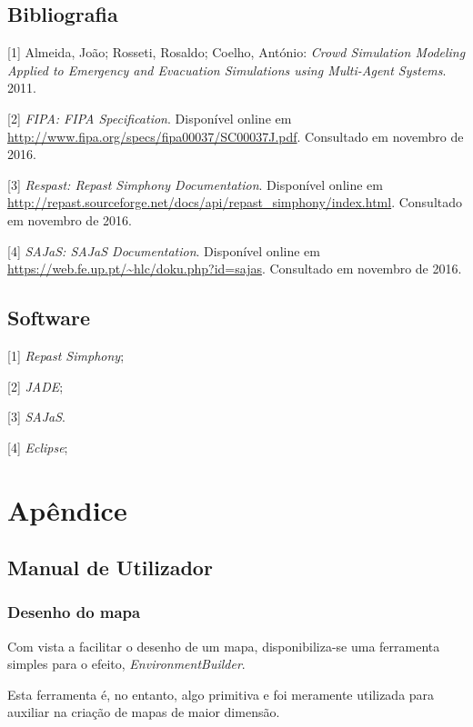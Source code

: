 \documentclass[12pt]{article}
\begin{document}
\begin{titlepage}
\subsection{Bibliografia}
[1] Almeida, João; Rosseti, Rosaldo; Coelho, António: \textit{Crowd Simulation Modeling Applied to Emergency and Evacuation Simulations using Multi-Agent Systems}. 2011.

[2] \textit{FIPA: FIPA Specification}. Disponível online em \url{http://www.fipa.org/specs/fipa00037/SC00037J.pdf}. Consultado em novembro de 2016.

[3] \textit{Respast: Repast Simphony Documentation}. Disponível online em \url{http://repast.sourceforge.net/docs/api/repast_simphony/index.html}. Consultado em novembro de 2016.

[4] \textit{SAJaS: SAJaS Documentation}. Disponível online em \url{https://web.fe.up.pt/~hlc/doku.php?id=sajas}. Consultado em novembro de 2016.


\subsection{Software}
[1] \textit{Repast Simphony};

[2] \textit{JADE};

[3] \textit{SAJaS}.

[4] \textit{Eclipse};

\newpage

\section{Apêndice}


\subsection{Manual de Utilizador}

\subsubsection{Desenho do mapa}

Com vista a facilitar o desenho de um mapa, disponibiliza-se uma ferramenta simples para o efeito, \textit{EnvironmentBuilder}.

Esta ferramenta é, no entanto, algo primitiva e foi meramente utilizada para auxiliar na criação de mapas de maior dimensão.


\end{titlepage}
\end{document}
